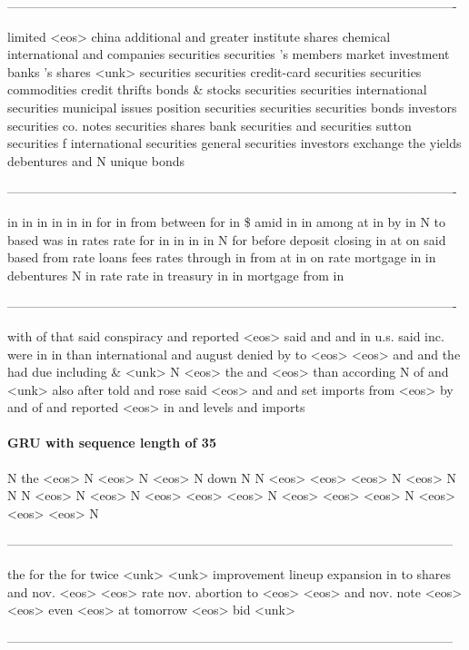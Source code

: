 \begin{enumerate}
----------------------------------------------------------------------------------------------------------

limited <eos> china additional and greater institute shares chemical international and companies securities securities 's members market investment banks 's shares <unk> securities securities credit-card securities securities commodities credit thrifts bonds \& stocks securities securities international securities municipal issues position securities securities securities bonds investors securities co. notes securities shares bank securities and securities sutton securities f international securities general securities investors exchange the yields debentures and N unique bonds

----------------------------------------------------------------------------------------------------------

in in in in in in for in from between for in \$ amid in in among at in by in N to based was in rates rate for in in in in N for before deposit closing in at on said based from rate loans fees rates through in from at in on rate mortgage in in debentures N in rate rate in treasury in in mortgage from in

----------------------------------------------------------------------------------------------------------

with of that said conspiracy and reported <eos> said and and in u.s. said inc. were in in than international and august denied by to <eos> <eos> and and the had due including \& <unk> N <eos> the and <eos> than according N of and <unk> also after told and rose said <eos> and and set imports from <eos> by and of and reported <eos> in and levels and imports


\paragraph{GRU with sequence length of 35}
N the <eos> N <eos> N <eos> N down N N <eos> <eos> <eos> N <eos> N N N <eos> N <eos> N <eos> <eos> <eos> N <eos> <eos> <eos> N <eos> <eos> <eos> N

---------------------------------------------------------------------------------------------------------

the for the for twice <unk> <unk> improvement lineup expansion in to shares and nov. <eos> <eos> rate nov. abortion to <eos> <eos> and nov. note <eos> <eos> even <eos> at tomorrow <eos> bid <unk>

---------------------------------------------------------------------------------------------------------


\end{enumerate}

